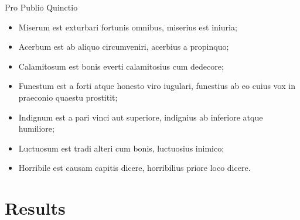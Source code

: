 \documentclass{beamer}
\begin{document}
\begin{frame}{Pro Publio Quinctio}
  \begin{itemize}
    \item<1-> Miserum est exturbari fortunis omnibus, miserius est \textcolor{uniboblue}{iniuria};
    \item<2-> Acerbum est ab aliquo circumveniri, acerbius a propinquo;
    \item<3-> Calamitosum est bonis everti calamitosius cum dedecore;
    \item<4-> Funestum est a forti atque \textcolor{unibored}{honesto viro iugulari}, funestius ab eo cuius vox in praeconio quaestu prostitit;
    \item<5-> Indignum est a pari vinci aut superiore, indignius ab inferiore atque humiliore;
    \item<6-> Luctuosum est tradi alteri cum bonis, luctuosius inimico;
    \item<7-> Horribile est causam capitis dicere, horribilius priore loco dicere.
  \end{itemize}
\end{frame}

\section{Results}
\end{document}
